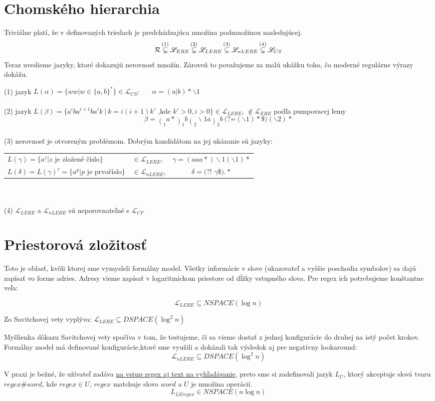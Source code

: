 \documentclass[myposter,portrait,plainboxedsections]{sciposter}
\def\R{{\cal R}} %
\def\L{\mathscr{L}} %
\def\le{LEregex}
\def\el{\mathscr{L}_{ERE}}
\def\lel{\mathscr{L}_{LERE}}
\def\nlel{\mathscr{L}_{nLERE}}
\def\lookahead{\text{(?=}}
\def\nlookahead{\text{(?!~}}
\def\mysection#1{
{\color{sectionCol}\section*{\sc\bfseries #1}}}
\begin{document}
\begin{multicols*}{3}
\mysection{Chomského hierarchia}
Triviálne platí, že v definovaných triedach je predchádzajúca množina podmnožinou nasledujúcej.
$$\R \mathop{\subsetneq}^{(1)} \el \mathop{\subsetneq}^{(2)} \lel \mathop{\subseteq}^{(3)} \nlel \mathop{\subsetneq}^{(4)} \L_{CS}$$
Teraz uvedieme jazyky, ktoré dokazujú nerovnosť množín. Zároveň to považujeme za malú ukážku toho, čo moderné regulárne výrazy dokážu.

(1) jazyk $L(\alpha) = \lbrace ww|w \in\lbrace a,b \rbrace^* \rbrace \in \L_{CS}$:~~~ $\alpha = (a|b)*\backslash 1$
\\ \\
(2) jazyk $L(\beta)=\lbrace a^iba^{i+1}ba^ik ~|~ k=i(i+1)k' \text{ ,kde } k'>0,i>0\rbrace \in \lel$, $\notin \el$ podľa pumpovacej lemy \cite{ExtendedRegexPower}
$$\beta=\mathop{(}_1 a*\mathop{)}_1 b \mathop{(}_2 \backslash 1 a \mathop{)}_2 b~ \lookahead (\backslash 1) *\$ ) (\backslash 2)* $$
\\ 
(3) nerovnosť je otvoreným problémom. Dobrým kandidátom na jej ukázanie sú jazyky:

\begin{tabular}{llc}
$L(\gamma) = \lbrace a^z | z \text{ je zložené číslo} \rbrace$ & $\in\lel$, & $\gamma = (aaa*)\backslash 1(\backslash 1)*$ \\
$L(\delta) = L(\gamma)^c = \lbrace a^p | p \text{ je prvočíslo} \rbrace$ & $\in\nlel$, & $\delta=\nlookahead \gamma\$).*$
\end{tabular}
\\ \\
(4) $\lel$ a $\nlel$ sú neporovnateľné s $\L_{CF}$

\mysection{Priestorová zložitosť}
Toto je oblasť, kvôli ktorej sme vymysleli formálny model. Všetky informácie v slove (ukazovateľ a vyššie poschodia symbolov) sa dajú zapísať vo forme adries. Adresy vieme zapísať v logaritmickom priestore od dĺžky vstupného slova. Pre regex ich potrebujeme konštantne veľa:

$$\lel \subseteq NSPACE(\log n)$$

Zo Savitchovej vety vyplýva:
$\lel \subseteq DSPACE(\log^2 n)$

Myšlienka dôkazu Savitchovej vety spočíva v tom, že testujeme, či sa vieme dostať z jednej konfigurácie do druhej na istý počet krokov. Formálny model má definované konfigurácie,ktoré sme využili a dokázali tak výsledok aj pre negatívny lookaround:
$$\nlel \subseteq DSPACE(\log^2 n)$$

V praxi je bežné, že užívateľ zadáva \underline{na vstup regex aj text na vyhľadávanie}, preto sme si zadefinovali jazyk $L_U$, ktorý akceptuje slová tvaru $regex\#word$, kde $regex\in U$, $regex$ matchuje slovo $word$ a $U$ je množina operácií.
$$L_{\le} \in NSPACE(n \log n)$$


\end{multicols*}
\end{document}
